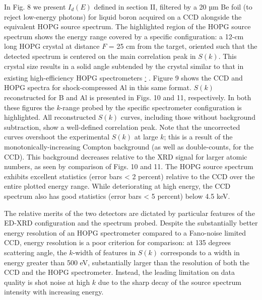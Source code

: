 In Fig. 8 we present \(I_{d}\left( E \right)\) defined in section II,
filtered by a 20 µm Be foil (to reject low-energy photons) for liquid
boron acquired on a CCD alongside the equivalent HOPG source spectrum.
The highlighted region of the HOPG source spectrum shows the energy
range covered by a specific configuration: a 12-cm long HOPG crystal at
distance \(F\) = 25 cm from the target, oriented such that the detected
spectrum is centered on the main correlation peak in \(S(k)\). This
crystal size results in a solid angle subtended by the crystal similar
to that in existing high-efficiency HOPG spectrometers
\hyperref[b.-yaakobi-2012-private-communication.]\textsuperscript{,}
\hyperref[a.-pak-g.-gregori-j.-knight-k.-campbell-d.-price-b.-hammel-o.-l.-landen-and-s.-h.-glenzer-review-of-scientific-instruments-75-3747-2004.]\cite{PAK2004X}.
Figure 9 shows the CCD and HOPG spectra for shock-compressed Al in this
same format. \(S\left( k \right)\) reconstructed for B and Al is
presented in Figs. 10 and 11, respectively. In both these figures the
\(k\)-range probed by the specific spectrometer configuration is
highlighted. All reconstructed \(S\left( k \right)\) curves, including
those without background subtraction, show a well-defined correlation
peak. Note that the uncorrected curves overshoot the experimental
\(S\left( k \right)\) at large \(k\); this is a result of the
monotonically-increasing Compton background (as well as double-counts,
for the CCD). This background decreases relative to the XRD signal for
larger atomic numbers, as seen by comparison of Figs. 10 and 11. The
HOPG source spectrum exhibits excellent statistics (error bars
\textless{} 2 percent) relative to the CCD over the entire plotted
energy range. While deteriorating at high energy, the CCD spectrum also
has good statistics (error bars \textless{} 5 percent) below 4.5 keV.

The relative merits of the two detectors are dictated by particular
features of the ED-XRD configuration and the spectrum probed. Despite
the substantially better energy resolution of an HOPG spectrometer
compared to a Fano-noise limited CCD, energy resolution is a poor
criterion for comparison: at 135 degrees scattering angle, the
\(k\)-width of features in \(S(k)\) corresponds to a width in energy
greater than 500 eV, substantially larger than the resolution of both
the CCD and the HOPG spectrometer. Instead, the leading limitation on
data quality is shot noise at high \(k\) due to the sharp decay of the
source spectrum intensity with increasing energy.

